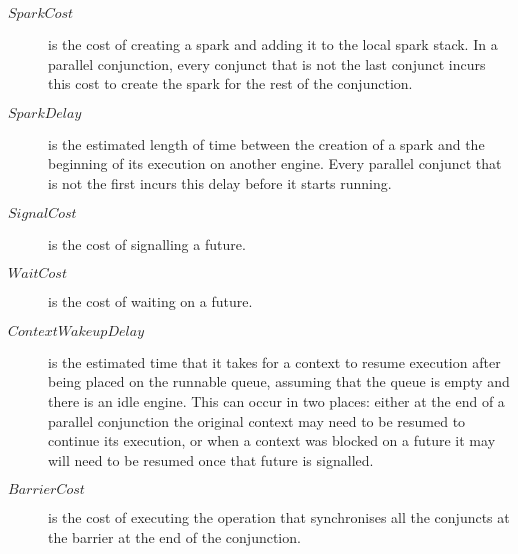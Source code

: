 \begin{description}
\item[$SparkCost$]
is the cost of creating a spark and adding it to the local spark stack.
In a parallel conjunction,
every conjunct that is not the last conjunct incurs this cost
to create the spark for the rest of the conjunction.
\item[$SparkDelay$]
is the estimated length of time between the creation of a spark
and the beginning of its execution on another engine.
Every parallel conjunct that is not the first incurs this delay
before it starts running.
\item[$SignalCost$]
is the cost of signalling a future.
\item[$WaitCost$]
is the cost of waiting on a future.
\item[$ContextWakeupDelay$]
is the estimated time that it takes for a context to resume execution
after being placed on the runnable queue,
assuming that the queue is empty and there is an idle engine.
This can occur in two places:
either at the end of a parallel conjunction the original context may need to
be resumed to continue its execution,
or when a context was blocked on a future it may will need to be resumed
once that future is signalled.
\item[$BarrierCost$]
is the cost of executing the operation
that synchronises all the conjuncts at the barrier
at the end of the conjunction.
\end{description}


